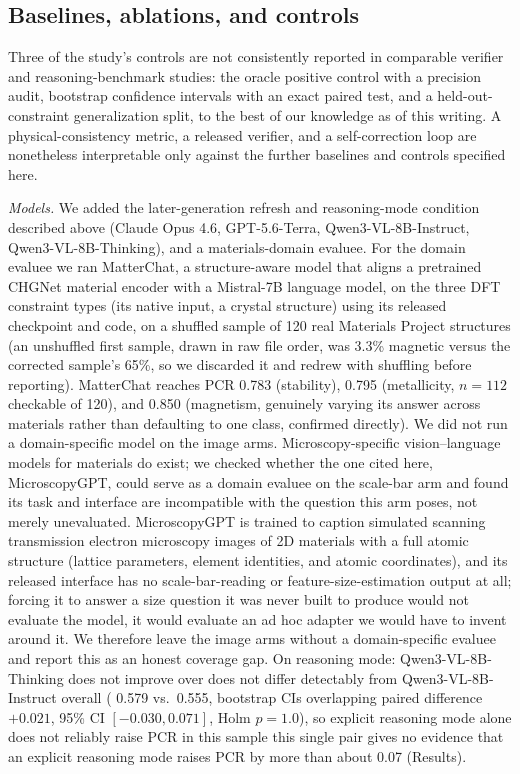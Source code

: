 \documentclass[pdflatex,sn-nature]{sn-jnl}
\newcommand{\rev}[1]{#1} %
\newcommand{\rev}[1]{{\color{blue}#1}} %
\providecommand{\DIFadd}[1]{{\protect\color{blue} \sf #1}} %
\providecommand{\DIFdel}[1]{{\protect\color{red} \scriptsize #1}} %
\providecommand{\DIFaddbegin}{} %
\providecommand{\DIFaddend}{} %
\providecommand{\DIFdelbegin}{} %
\providecommand{\DIFdelend}{} %
\providecommand{\DIFscaledelfig}{0.5}
\newlength{\DIFdelgraphicswidth} %
\newlength{\DIFdelgraphicsheight} %
\providecommand{\DIFaddincludegraphics}[2][]{{\color{blue}\fbox{\DIFOincludegraphics[#1]{#2}}}} %
\providecommand{\DIFdelincludegraphics}[2][]{%
\sbox{\DIFdelgraphicsbox}{\DIFOincludegraphics[#1]{#2}}%
\settoboxwidth{\DIFdelgraphicswidth}{\DIFdelgraphicsbox} %
\settoboxtotalheight{\DIFdelgraphicsheight}{\DIFdelgraphicsbox} %
\scalebox{\DIFscaledelfig}{%
\parbox[b]{\DIFdelgraphicswidth}{\usebox{\DIFdelgraphicsbox}\\[-\baselineskip] \rule{\DIFdelgraphicswidth}{0em}}\llap{\resizebox{\DIFdelgraphicswidth}{\DIFdelgraphicsheight}{%
\setlength{\unitlength}{\DIFdelgraphicswidth}%
\begin{picture}(1,1)%
\thicklines\linethickness{2pt} %
{\color[rgb]{1,0,0}\put(0,0){\framebox(1,1){}}}%
{\color[rgb]{1,0,0}\put(0,0){\line( 1,1){1}}}%
{\color[rgb]{1,0,0}\put(0,1){\line(1,-1){1}}}%
\end{picture}%
}\hspace*{3pt}}} %
} %
\DeclareRobustCommand{\DIFaddbegin}{\DIFOaddbegin \let\includegraphics\DIFaddincludegraphics} %
\DeclareRobustCommand{\DIFaddend}{\DIFOaddend \let\includegraphics\DIFOincludegraphics} %
\DeclareRobustCommand{\DIFdelbegin}{\DIFOdelbegin \let\includegraphics\DIFdelincludegraphics} %
\DeclareRobustCommand{\DIFdelend}{\DIFOaddend \let\includegraphics\DIFOincludegraphics} %
\begin{document}
\subsection*{Baselines, ablations, and controls}
Three of the study's controls are not consistently reported in comparable
verifier and reasoning-benchmark studies: the oracle positive control with a
precision audit, bootstrap confidence intervals with an exact paired test, and a
held-out-constraint generalization split, to the best of our knowledge as of this
writing. A physical-consistency metric, a released verifier, and a
self-correction loop are nonetheless interpretable only against the further
baselines and controls specified here.

\noindent\emph{Models.} We added the later-generation refresh and reasoning-mode
condition described above (Claude Opus 4.6, GPT-5.6-Terra, Qwen3-VL-8B-Instruct,
Qwen3-VL-8B-Thinking), and a materials-domain evaluee. For the domain evaluee we ran
MatterChat\cite{matterchat2026}, a structure-aware model that aligns a pretrained CHGNet
material encoder with a Mistral-7B language model, on the three DFT constraint types (its
native input, a crystal structure) using its released checkpoint and code, on a shuffled
sample of 120 real Materials Project structures (an unshuffled first sample, drawn in raw
file order, was 3.3\% magnetic versus the corrected sample's 65\%, so we discarded it and
redrew with shuffling before reporting). MatterChat reaches PCR 0.783 (stability), 0.795
(metallicity, $n=112$ checkable of 120), and 0.850 (magnetism, genuinely varying its answer
across materials rather than defaulting to one class, confirmed directly). We did not run a domain-specific model on the image arms.
Microscopy-specific vision--language models for materials do exist; we checked whether the
one cited here, MicroscopyGPT,\cite{choudhary2025microscopygpt} could serve as a domain
evaluee on the scale-bar arm and found its task and interface are incompatible with the
question this arm poses, not merely unevaluated. MicroscopyGPT is trained to caption
simulated scanning transmission electron microscopy images of 2D materials with a full
atomic structure (lattice parameters, element identities, and atomic coordinates), and its
released interface has no scale-bar-reading or feature-size-estimation output at all; forcing
it to answer a size question it was never built to produce would not evaluate the model, it
would evaluate an ad hoc adapter we would have to invent around it. We therefore leave the
image arms without a domain-specific evaluee and report this as an honest coverage gap. On reasoning mode: Qwen3-VL-8B-Thinking \DIFdelbegin \DIFdel{does not improve over
}\DIFdelend \DIFaddbegin \DIFadd{\rev{does not differ detectably from}
}\DIFaddend Qwen3-VL-8B-Instruct overall (\DIFdelbegin \DIFdel{0.579 vs.\ 0.555, bootstrap CIs overlapping}\DIFdelend \DIFaddbegin \DIFadd{\rev{paired difference $+0.021$, 95\% CI $[-0.030,0.071]$, Holm $p=1.0$}}\DIFaddend ), so
\DIFdelbegin \DIFdel{explicit
reasoning mode alone does not reliably raise PCR in this sample }\DIFdelend \DIFaddbegin \DIFadd{\rev{this single pair gives no evidence that an explicit reasoning mode raises PCR by more than about 0.07} }\DIFaddend (Results).
\end{document}
